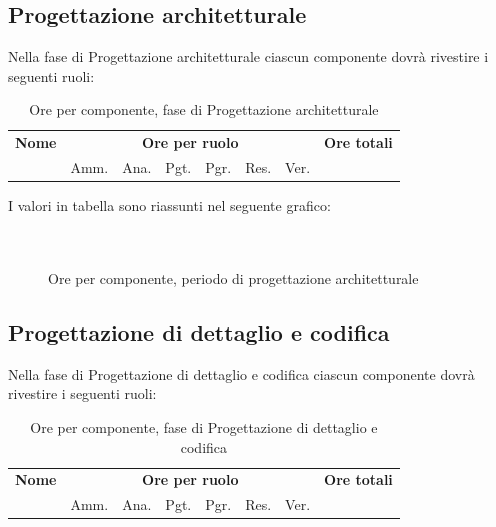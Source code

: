 \pagebreak
\subsection{Progettazione architetturale}

Nella fase di Progettazione architetturale ciascun componente dovrà rivestire i seguenti ruoli:

\begin{table}[H]
\centering
\begin{tabular}{lccccccc}
\toprule 
    \textbf{Nome}  & \multicolumn{6}{c}{\textbf{Ore per ruolo}} & \textbf{Ore totali} \\
     & Amm. & Ana. & Pgt. & Pgr. & Res. & Ver. \\
    \midrule
    
    	
    
    \bottomrule
\end{tabular}
\caption{Ore per componente, fase di Progettazione architetturale}
\end{table}
I valori in tabella sono riassunti nel seguente grafico: \\ \\ \\

\begin{figure}[H]
\caption{Ore per componente, periodo di progettazione architetturale}
\end{figure}

\pagebreak
\subsection{Progettazione di dettaglio e codifica}

Nella fase di Progettazione di dettaglio e codifica ciascun componente dovrà rivestire i seguenti ruoli:

\begin{table}[H]
\centering
\begin{tabular}{lccccccc}
\toprule 
    \textbf{Nome}  & \multicolumn{6}{c}{\textbf{Ore per ruolo}} & \textbf{Ore totali}\\
     & Amm. & Ana. & Pgt. & Pgr. & Res. & Ver. \\
    \midrule

    	

    \bottomrule
\end{tabular}
\caption{Ore per componente, fase di Progettazione di dettaglio e codifica}
\end{table}

